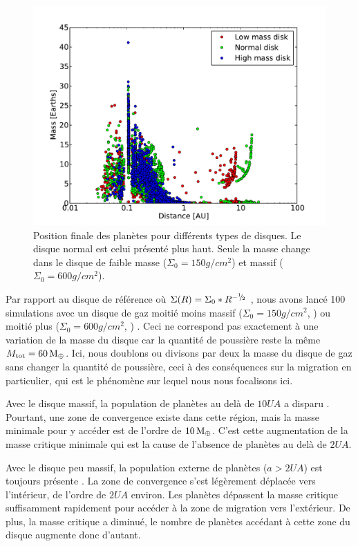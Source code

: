 \begin{figure}[htbp]
\centering
\includegraphics[width=0.8\linewidth]{figure/HSE/HSE_disk_effect.pdf}
\caption[Influence de la masse du disque sur les propriétés statistiques des systèmes formés.]{Position finale des planètes pour
différents types de disques. Le disque normal est celui présenté plus haut. Seule la masse change dans le disque de faible masse
($\Sigma_0=150\unit{g/cm^2}$) et massif ($\Sigma_0=600\unit{g/cm^2}$).}\label{fig:HSE_disk_effect}
\end{figure}

Par rapport au disque de référence où $\Sigma(R) = \Sigma_0 * R^{-{{}^{1\!\!}/ _{\!2}}}$ , nous avons lancé 100
simulations avec un disque de gaz moitié moins massif ($\Sigma_0=150\unit{g/cm^2}$, ) ou moitié plus
($\Sigma_0=600\unit{g/cm^2}$, ) . Ceci ne correspond pas exactement à une variation de la masse du disque car la quantité de poussière reste la même $M_\text{tot}=60\mathrm{\thinspace M_\oplus}$. Ici, nous doublons ou divisons par deux la masse du disque de gaz sans changer la quantité de poussière, ceci à des conséquences sur la migration en particulier, qui est le phénomène sur lequel nous nous focalisons ici.

Avec le disque massif, la population de planètes au delà de $10\unit{UA}$ a disparu . Pourtant, une zone de convergence existe dans cette région, mais la masse minimale pour y accéder est de l'ordre de $10\mathrm{\thinspace M_\oplus}$. C'est cette augmentation de la masse critique minimale qui est la cause de l'absence de planètes au delà de $2\unit{UA}$.

Avec le disque peu massif, la population externe de planètes ($a>2\unit{UA}$) est toujours présente . La zone de convergence s'est légèrement déplacée vers l'intérieur, de l'ordre de $2\unit{UA}$ environ. Les planètes dépassent la masse critique suffisamment rapidement pour accéder à la zone de migration vers l'extérieur. De plus, la masse critique a diminué, le nombre de planètes accédant à cette zone du disque augmente donc d'autant.

